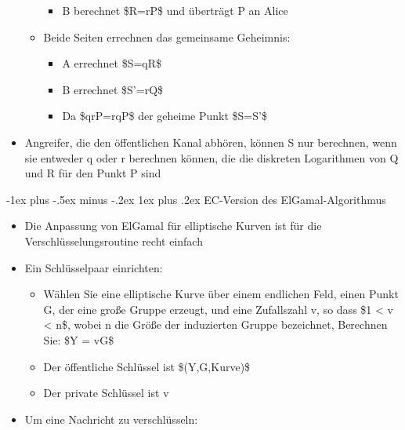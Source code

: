 \documentclass[a4paper]{article}
\makeatletter
\renewcommand{\subsubsection}{\@startsection{subsubsection}{3}{0mm}%
 {-1ex plus -.5ex minus -.2ex}%
 {1ex plus .2ex}%
 {\normalfont\small\bfseries}}
\makeatother
\begin{document}
\begin{multicols}{3}
\begin{itemize}
\begin{itemize}
                        \begin{itemize}
                            \item
                                  B berechnet \$R=rP\$ und überträgt P an Alice
                        \end{itemize}
                  \item
                        Beide Seiten errechnen das gemeinsame Geheimnis:

                        \begin{itemize}
                            \item
                                  A errechnet \$S=qR\$
                            \item
                                  B errechnet \$S'=rQ\$
                            \item
                                  Da \$qrP=rqP\$ der geheime Punkt \$S=S'\$
                        \end{itemize}
              \end{itemize}
        \item
              Angreifer, die den öffentlichen Kanal abhören, können S nur berechnen,
              wenn sie entweder q oder r berechnen können, die die diskreten
              Logarithmen von Q und R für den Punkt P sind
    \end{itemize}


    \subsubsection{EC-Version des
        ElGamal-Algorithmus}

    \begin{itemize}
        \item
              Die Anpassung von ElGamal für elliptische Kurven ist für die
              Verschlüsselungsroutine recht einfach
        \item
              Ein Schlüsselpaar einrichten:

              \begin{itemize}
                  \item
                        Wählen Sie eine elliptische Kurve über einem endlichen Feld, einen
                        Punkt G, der eine große Gruppe erzeugt, und eine Zufallszahl v, so
                        dass \$1 \textless{} v \textless{} n\$, wobei n die Größe der
                        induzierten Gruppe bezeichnet, Berechnen Sie: \$Y = vG\$
                  \item
                        Der öffentliche Schlüssel ist \$(Y,G,Kurve)\$
                  \item
                        Der private Schlüssel ist v
              \end{itemize}
        \item
              Um eine Nachricht zu verschlüsseln:


\end{itemize}
\end{multicols}
\end{document}

